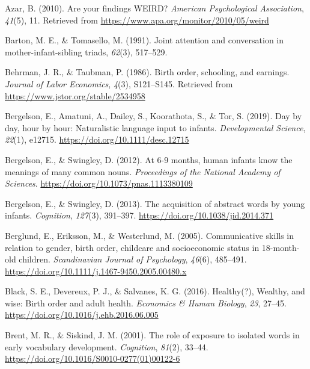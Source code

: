 \documentclass[man,floatsintext]{apa6}
\begin{document}
\leavevmode\hypertarget{ref-azar_are_2010}{}%
Azar, B. (2010). Are your findings WEIRD? \emph{American Psychological Association}, \emph{41}(5), 11. Retrieved from \url{https://www.apa.org/monitor/2010/05/weird}

\leavevmode\hypertarget{ref-barton_joint_1991}{}%
Barton, M. E., \& Tomasello, M. (1991). Joint attention and conversation in mother-infant-sibling triads, \emph{62}(3), 517--529.

\leavevmode\hypertarget{ref-behrman_birth_1986}{}%
Behrman, J. R., \& Taubman, P. (1986). Birth order, schooling, and earnings. \emph{Journal of Labor Economics}, \emph{4}(3), S121--S145. Retrieved from \url{https://www.jstor.org/stable/2534958}

\leavevmode\hypertarget{ref-bergelson_day_2019}{}%
Bergelson, E., Amatuni, A., Dailey, S., Koorathota, S., \& Tor, S. (2019). Day by day, hour by hour: Naturalistic language input to infants. \emph{Developmental Science}, \emph{22}(1), e12715. \url{https://doi.org/10.1111/desc.12715}

\leavevmode\hypertarget{ref-bergelson_at_2012}{}%
Bergelson, E., \& Swingley, D. (2012). At 6-9 months, human infants know the meanings of many common nouns. \emph{Proceedings of the National Academy of Sciences}. \url{https://doi.org/10.1073/pnas.1113380109}

\leavevmode\hypertarget{ref-bergelson_acquisition_2013}{}%
Bergelson, E., \& Swingley, D. (2013). The acquisition of abstract words by young infants. \emph{Cognition}, \emph{127}(3), 391--397. \url{https://doi.org/10.1038/jid.2014.371}

\leavevmode\hypertarget{ref-berglund_communicative_2005}{}%
Berglund, E., Eriksson, M., \& Westerlund, M. (2005). Communicative skills in relation to gender, birth order, childcare and socioeconomic status in 18-month-old children. \emph{Scandinavian Journal of Psychology}, \emph{46}(6), 485--491. \url{https://doi.org/10.1111/j.1467-9450.2005.00480.x}

\leavevmode\hypertarget{ref-black_healthy_2016}{}%
Black, S. E., Devereux, P. J., \& Salvanes, K. G. (2016). Healthy(?), Wealthy, and wise: Birth order and adult health. \emph{Economics \& Human Biology}, \emph{23}, 27--45. \url{https://doi.org/10.1016/j.ehb.2016.06.005}

\leavevmode\hypertarget{ref-brent_role_2001}{}%
Brent, M. R., \& Siskind, J. M. (2001). The role of exposure to isolated words in early vocabulary development. \emph{Cognition}, \emph{81}(2), 33--44. \url{https://doi.org/10.1016/S0010-0277(01)00122-6}
\end{document}
